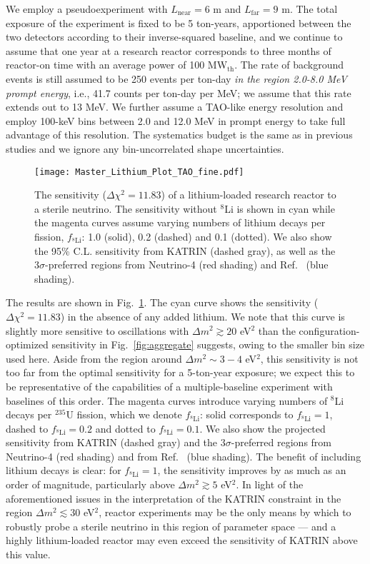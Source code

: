 \documentclass[prd, twocolumn, tightenlines, twoside, secnumarabic, superscriptaddress, preprintnumbers, nofootinbib, notitlepage]{revtex4-1}
\begin{document}
We employ a pseudoexperiment with $L_\text{near} = 6$ m and $L_\text{far} = 9$ m. The total exposure of the experiment is fixed to be 5 ton-years, apportioned between the two detectors according to their inverse-squared baseline, and we continue to assume that one year at a research reactor corresponds to three months of reactor-on time with an average power of 100 MW$_\text{th}$. The rate of background events is still assumed to be 250 events per ton-day \emph{in the region 2.0-8.0 MeV prompt energy}, i.e., 41.7 counts per ton-day per MeV; we assume that this rate extends out to 13 MeV. We further assume a TAO-like energy resolution and employ 100-keV bins between 2.0 and 12.0 MeV in prompt energy to take full advantage of this resolution. The systematics budget is the same as in previous studies and we ignore any bin-uncorrelated shape uncertainties.

\begin{figure}[t]
    \texttt{[image: Master\_Lithium\_Plot\_TAO\_fine.pdf]}
    \caption{The sensitivity ($\Delta \chi^2 = 11.83$) of a lithium-loaded research reactor to a sterile neutrino. The sensitivity without $^8$Li is shown in cyan while the magenta curves assume varying numbers of lithium decays per fission, $f_{^8\text{Li}}$: 1.0 (solid), 0.2 (dashed) and 0.1 (dotted). We also show the 95\% C.L. sensitivity from KATRIN (dashed gray), as well as the $3\sigma$-preferred regions from Neutrino-4 \cite{Neutrino4talk} (red shading) and Ref.~\cite{Berryman:2020agd} (blue shading).}
    \label{fig:lithium}
\end{figure}

The results are shown in Fig.~\ref{fig:lithium}. The cyan curve shows the sensitivity ($\Delta \chi^2 = 11.83$) in the absence of any added lithium. We note that this curve is slightly more sensitive to oscillations with $\Delta m^2 \gtrsim 20$ eV$^2$ than the configuration-optimized sensitivity in Fig.~\ref{fig:aggregate} suggests, owing to the smaller bin size used here. Aside from the region around $\Delta m^2 \sim 3-4$ eV$^2$, this sensitivity is not too far from the optimal sensitivity for a 5-ton-year exposure; we expect this to be representative of the capabilities of a multiple-baseline experiment with baselines of this order. The magenta curves introduce varying numbers of $^8$Li decays per $^{235}$U fission, which we denote $f_{^8\text{Li}}$: solid corresponds to $f_{^8\text{Li}} = 1$, dashed to $f_{^8\text{Li}} = 0.2$ and dotted to $f_{^8\text{Li}} = 0.1$. We also show the projected sensitivity from KATRIN (dashed gray) and the $3\sigma$-preferred regions from Neutrino-4 (red shading) and from Ref.~\cite{Berryman:2020agd} (blue shading). The benefit of including lithium decays is clear: for $f_{^8\text{Li}} = 1$, the sensitivity improves by as much as an order of magnitude, particularly above $\Delta m^2 \gtrsim 5$ eV$^2$. In light of the aforementioned issues in the interpretation of the KATRIN constraint in the region $\Delta m^2 \lesssim 30$ eV$^2$, reactor experiments may be the only means by which to robustly probe a sterile neutrino in this region of parameter space --- and a highly lithium-loaded reactor may even exceed the sensitivity of KATRIN above this value.
\end{document}
